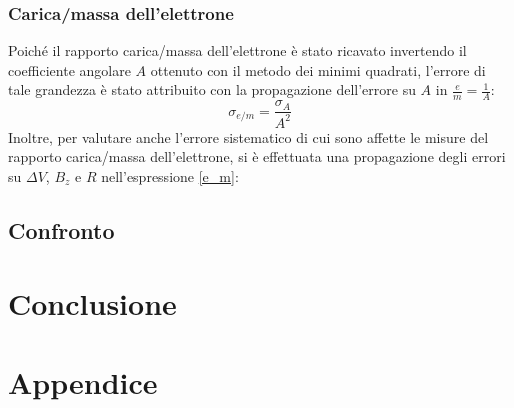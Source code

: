 \documentclass[]{article}
\let\oldsection\section%
\renewcommand{\section}{%
	\renewcommand{\theequation}{\thesection.\arabic{equation}}%
	\oldsection}%
\let\oldsubsection\subsection%
\renewcommand{\subsection}{%
	\renewcommand{\theequation}{\thesubsection.\arabic{equation}}%
	\oldsubsection}%
\begin{document}
    \subsubsection{Carica/massa dell'elettrone}
    Poiché il rapporto carica/massa dell'elettrone è stato ricavato invertendo il coefficiente angolare $A$ ottenuto con il metodo dei minimi quadrati, l'errore di tale grandezza è stato attribuito con la propagazione dell'errore su $A$ in $\frac{e}{m}=\frac{1}{A}$:
    \begin{equation}
        \label{sigma_e/m}
        \sigma _{e/m} = \frac{\sigma_A}{A^2} 
    \end{equation}
    Inoltre, per valutare anche l'errore sistematico di cui sono affette le misure del rapporto carica/massa dell'elettrone, si è effettuata una propagazione degli errori su $\Delta V$, $B_z$ e $R$ nell'espressione \ref{e_m}:

    \subsection{Confronto}

    \section{Conclusione}

    \newpage
    \section{Appendice}
\end{document}
